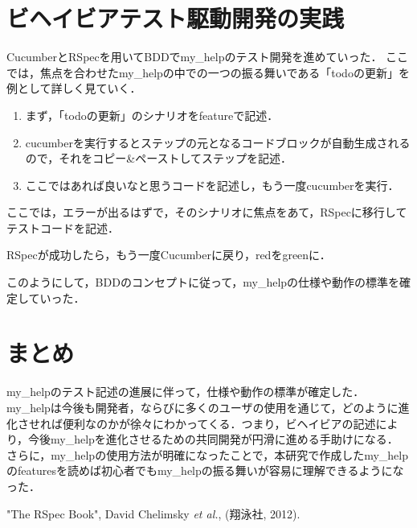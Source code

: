 \documentclass[10pt,a4j,twocolumn]{jsarticle}
\begin{document}
\section{ビヘイビアテスト駆動開発の実践}
CucumberとRSpecを用いてBDDでmy\_helpのテスト開発を進めていった．
ここでは，焦点を合わせたmy\_helpの中での一つの振る舞いである「todoの更新」を例として詳しく見ていく．

\begin{description}
\item[cucumber]
\begin{enumerate}
\item まず，「todoの更新」のシナリオをfeatureで記述．
\item cucumberを実行するとステップの元となるコードブロックが自動生成されるので，それをコピー\&ペーストしてステップを記述．
\item ここではあれば良いなと思うコードを記述し，もう一度cucumberを実行．
\end{enumerate}
\item[rspec]
\item ここでは，エラーが出るはずで，そのシナリオに焦点をあて，RSpecに移行してテストコードを記述．
\item[cucumber] 
\item RSpecが成功したら，もう一度Cucumberに戻り，redをgreenに．
\end{description}
このようにして，BDDのコンセプトに従って，my\_helpの仕様や動作の標準を確定していった．

\section{まとめ}
\vspace{-0.5em}
my\_helpのテスト記述の進展に伴って，仕様や動作の標準が確定した．
my\_helpは今後も開発者，ならびに多くのユーザの使用を通じて，どのように進化させれば便利なのかが徐々にわかってくる．つまり，ビヘイビアの記述により，今後my\_helpを進化させるための共同開発が円滑に進める手助けになる．
さらに，my\_helpの使用方法が明確になったことで，本研究で作成したmy\_helpのfeaturesを読めば初心者でもmy\_helpの振る舞いが容易に理解できるようになった．

\begin{thebibliography}{99}
   "The RSpec Book", David Chelimsky {\it et al.}, (翔泳社, 2012).
\end{thebibliography}
\end{document}

